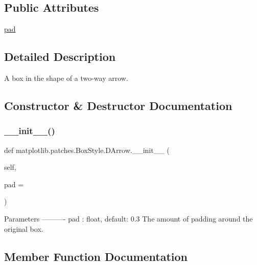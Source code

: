 \subsection*{Public Attributes}
\begin{DoxyCompactItemize}
\item 
\hyperlink{classmatplotlib_1_1patches_1_1BoxStyle_1_1DArrow_a3e3e34e71c2119467e24d32238673366}{pad}
\end{DoxyCompactItemize}


\subsection{Detailed Description}
\begin{DoxyVerb}A box in the shape of a two-way arrow.\end{DoxyVerb}
 

\subsection{Constructor \& Destructor Documentation}
\mbox{\label{classmatplotlib_1_1patches_1_1BoxStyle_1_1DArrow_a29e1d6076f80c3f4deff4a30552057ec}} 
\subsubsection{\texorpdfstring{\+\_\+\+\_\+init\+\_\+\+\_\+()}{\_\_init\_\_()}}
{\footnotesize\ttfamily def matplotlib.\+patches.\+Box\+Style.\+D\+Arrow.\+\_\+\+\_\+init\+\_\+\+\_\+ (\begin{DoxyParamCaption}\item[{}]{self,  }\item[{}]{pad = {} }\end{DoxyParamCaption})}

\begin{DoxyVerb}Parameters
----------
pad : float, default: 0.3
    The amount of padding around the original box.
\end{DoxyVerb}
 

\subsection{Member Function Documentation}
\mbox{\label{classmatplotlib_1_1patches_1_1BoxStyle_1_1DArrow_a45356a9bb394319c8fc2de29fb9b3b06}} 
